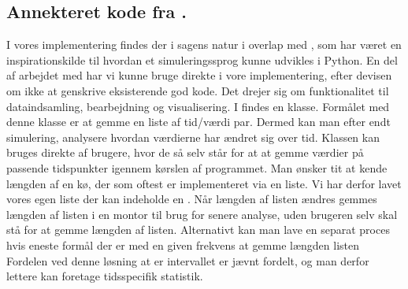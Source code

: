 \subsection{Annekteret kode fra \simpy.}
I vores implementering findes der i sagens natur i overlap med \simpy, som har været en inspirationskilde til hvordan et simuleringssprog kunne udvikles i Python. En del af arbejdet med \simpy har vi kunne bruge direkte i vore implementering, efter devisen om ikke at genskrive eksisterende god kode. Det drejer sig om funktionalitet til dataindsamling, bearbejdning og visualisering. I \simpy findes en klasse. Formålet med denne klasse er at gemme en liste af tid/værdi par. Dermed kan man efter endt simulering, analysere  hvordan værdierne har ændret sig over tid. Klassen  kan bruges direkte af brugere, hvor de så selv  står for at at gemme værdier på passende tidspunkter igennem kørslen af programmet. Man ønsker tit at kende længden af en kø, der som oftest er implementeret via en liste. Vi har derfor lavet vores egen liste der kan indeholde en . Når længden af listen ændres gemmes længden af listen i en montor til brug for senere analyse, uden brugeren selv skal stå for at gemme længden af listen. Alternativt kan man lave en separat proces hvis eneste formål der er med en given frekvens at gemme længden listen Fordelen ved denne løsning at er intervallet er jævnt fordelt, og man derfor lettere kan foretage tidsspecifik statistik.


